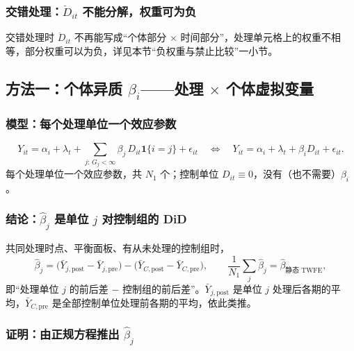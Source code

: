 \subsubsection{交错处理：\texorpdfstring{$\ddot D_{it}$}{D double dot} 不能分解，权重可为负}

交错处理时 $\ddot D_{it}$ 不再能写成“个体部分 $\times$ 时间部分”，处理单元格上的权重不相等，部分权重可以为负，详见本节“负权重与禁止比较”一小节。

\subsection{方法一：个体异质 \texorpdfstring{$\beta_i$}{beta\_i}——处理 \texorpdfstring{$\times$}{x} 个体虚拟变量}\label{sec:U17b-m1}

\subsubsection{模型：每个处理单位一个效应参数}

\begin{defn}\label{def:U17b-m1}
\[
Y_{it}=\alpha_i+\lambda_t+\sum_{j:\,G_j<\infty}\beta_j\,D_{it}\mathbf{1}\{i=j\}+\epsilon_{it}
\quad\Longleftrightarrow\quad
Y_{it}=\alpha_i+\lambda_t+\beta_iD_{it}+\epsilon_{it}.
\]
每个处理单位一个效应参数，共 $N_1$ 个；控制单位 $D_{it}\equiv0$，没有（也不需要）$\beta_i$。
\end{defn}

\subsubsection{结论：\texorpdfstring{$\hat\beta_j$}{beta\_j hat} 是单位 \texorpdfstring{$j$}{j} 对控制组的 DiD}

\begin{thm}\label{thm:U17b-m1}
共同处理时点、平衡面板、有从未处理的控制组时，
\[
\hat\beta_j=\bigl(\bar Y_{j,\mathrm{post}}-\bar Y_{j,\mathrm{pre}}\bigr)-\bigl(\bar Y_{C,\mathrm{post}}-\bar Y_{C,\mathrm{pre}}\bigr),\qquad
\frac1{N_1}\sum_j\hat\beta_j=\hat\beta_{\text{静态 TWFE}},
\]
即“处理单位 $j$ 的前后差 $-$ 控制组的前后差”。$\bar Y_{j,\mathrm{post}}$ 是单位 $j$ 处理后各期的平均，$\bar Y_{C,\mathrm{pre}}$ 是全部控制单位处理前各期的平均，依此类推。
\end{thm}

\subsubsection{证明：由正规方程推出 \texorpdfstring{$\hat\beta_j$}{beta\_j hat}}

